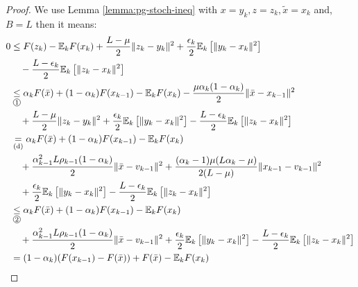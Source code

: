 \documentclass[12pt]{article}
\newcommand{\expect}{\ensuremath{\mathbb E}}
\begin{document}
\begin{proof}
            \par
            We use Lemma \ref{lemma:pg-stoch-ineq} with $x = y_k, z = z_k, \tilde x = x_{k}$ and, $B = L$ then it means: 
            {\allowdisplaybreaks
            \begin{align*}
                0 &\le 
                F(z_k) - \expect_k F(x_k) 
                + \frac{L - \mu}{2}\Vert z_k - y_k\Vert^2 
                + \frac{\epsilon_k}{2}\expect_k \left[\Vert y_k - x_k \Vert^2\right] 
                    \\&\quad
                    - \frac{L - \epsilon_k}{2}\expect_k \left[\Vert z_k - x_k\Vert^2\right]
                \\
                &\underset{\circled{1}}{\le} 
                \alpha_k F(\bar x) + (1 - \alpha_k)F(x_{k - 1}) - \expect_k F(x_k) - \frac{\mu\alpha_k(1 - \alpha_k)}{2}\Vert \bar x - x_{k - 1}\Vert^2
                    \\&\quad 
                    + \frac{L - \mu}{2}\Vert z_k - y_k\Vert^2 
                    + \frac{\epsilon_k}{2}\expect_k \left[\Vert y_k - x_k \Vert^2\right] 
                    - \frac{L - \epsilon_k}{2}\expect_k \left[\Vert z_k - x_k\Vert^2\right]
                \\
                &\underset{\text{(d)}}{=}
                \alpha_k F(\bar x) + (1 - \alpha_k)F(x_{k - 1}) - \expect_k F(x_k) 
                    \\&\quad 
                    + \frac{\alpha_{k - 1}^2L \rho_{k - 1}(1 - \alpha_k)}{2}\Vert \bar x - v_{k - 1}\Vert^2
                    + \frac{(\alpha_k - 1)\mu(L\alpha_k - \mu)}{2(L - \mu)}\Vert x_{k - 1} - v_{k - 1}\Vert^2
                    \\&\quad 
                    + \frac{\epsilon_k}{2}\expect_k \left[\Vert y_k - x_k \Vert^2\right] 
                    - \frac{L - \epsilon_k}{2}\expect_k \left[\Vert z_k - x_k\Vert^2\right]
                \\&\underset{\circled{2}}{\le}
                \alpha_k F(\bar x) + (1 - \alpha_k)F(x_{k - 1}) - \expect_k F(x_k) 
                    \\&\quad 
                    + \frac{\alpha_{k - 1}^2L \rho_{k - 1}(1 - \alpha_k)}{2}\Vert \bar x - v_{k - 1}\Vert^2
                    + \frac{\epsilon_k}{2}\expect_k \left[\Vert y_k - x_k \Vert^2\right] 
                    - \frac{L - \epsilon_k}{2}\expect_k \left[\Vert z_k - x_k\Vert^2\right]
                \\&= 
                (1 - \alpha_k)(F(x_{k - 1}) - F(\bar x)) + F(\bar x) - \expect_kF(x_k)

\end{align*}}
\end{proof}
\end{document}
